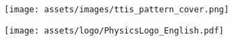 \begin{titlepage}
\begin{figure}[H]
    \centering
    \texttt{[image: assets/images/ttis\_pattern\_cover.png]}
    \label{fig:cover_photo}
\end{figure}

\vspace*{\fill}
\begin{figure}[H]
    \texttt{[image: assets/logo/PhysicsLogo\_English.pdf]}
    \label{fig:cover_auth_logo2}
\end{figure}

\end{titlepage}
